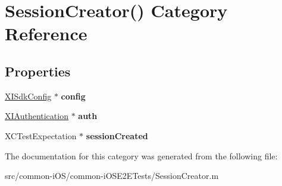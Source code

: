 \hypertarget{category_session_creator_07_08}{}\section{Session\+Creator() Category Reference}
\label{category_session_creator_07_08}
\subsection*{Properties}
\begin{DoxyCompactItemize}
\item 
\hypertarget{category_session_creator_07_08_a35905e24396195808428a039084084bd}{}\label{category_session_creator_07_08_a35905e24396195808428a039084084bd} 
\hyperlink{class_x_i_sdk_config}{X\+I\+Sdk\+Config} $\ast$ {\bfseries config}
\item 
\hypertarget{category_session_creator_07_08_a337f5bd13a84a357daded3b4b98abca1}{}\label{category_session_creator_07_08_a337f5bd13a84a357daded3b4b98abca1} 
\hyperlink{class_x_i_authentication}{X\+I\+Authentication} $\ast$ {\bfseries auth}
\item 
\hypertarget{category_session_creator_07_08_a683385f7a08003530aa2b0085e0a0129}{}\label{category_session_creator_07_08_a683385f7a08003530aa2b0085e0a0129} 
X\+C\+Test\+Expectation $\ast$ {\bfseries session\+Created}
\end{DoxyCompactItemize}


The documentation for this category was generated from the following file\+:\begin{DoxyCompactItemize}
\item 
src/common-\/i\+O\+S/common-\/i\+O\+S\+E2\+E\+Tests/Session\+Creator.\+m\end{DoxyCompactItemize}
